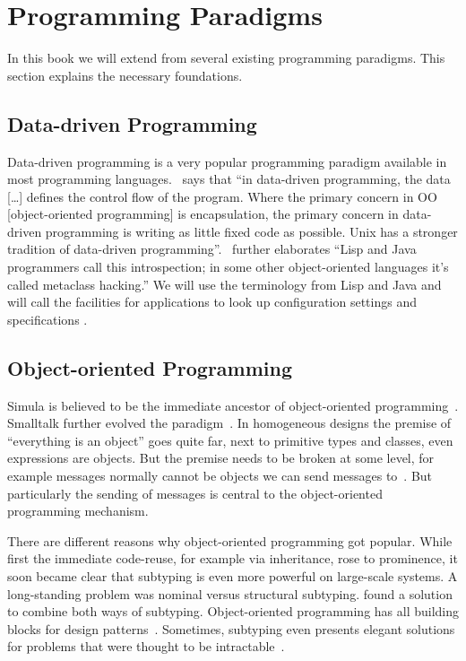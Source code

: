 \section{Programming Paradigms}

In this book we will extend from several existing programming paradigms.
This section explains the necessary foundations.


\subsection{Data-driven Programming}

Data-driven programming is a very popular programming paradigm available in most programming languages.
\citet{raymond2003art}~says that \enquote{in data-driven programming, the data [\ldots] defines the control flow of the program. Where the primary concern in OO [object-oriented programming] is encapsulation, the primary concern in data-driven programming is writing as little fixed code as possible. Unix has a stronger tradition of data-driven programming}.
\citet{raymond2003art}~further elaborates \enquote{Lisp and Java programmers call this introspection; in some other object-oriented languages it’s called metaclass hacking.}
We will use the terminology from Lisp and Java and will call the facilities for applications to look up configuration settings and specifications .

\subsection{Object-oriented Programming}

Simula is believed to be the immediate ancestor of object-oriented programming~\cite{rentsch1982object}.
Smalltalk further evolved the paradigm~\cite{nierstrasz1987object}.
In homogeneous designs the premise of ``everything is an object'' goes quite far, next to primitive types and classes, even expressions are objects.
But the premise needs to be broken at some level, for example messages normally cannot be objects we can send messages to~\cite{nierstrasz1987object}.
But particularly the sending of messages is central to the object-oriented programming mechanism.

There are different reasons why object-oriented programming got popular.
While first the immediate code-reuse, for example via inheritance, rose to prominence, it soon became clear that subtyping is even more powerful on large-scale systems.
A long-standing problem was nominal versus structural subtyping.
\citet{malayeri2008integrating} found a solution to combine both ways of subtyping.
Object-oriented programming has all building blocks for design patterns~\cite{gamma1994design}.
Sometimes, subtyping even presents elegant solutions for problems that were thought to be intractable~\cite{wang2016expression}.

